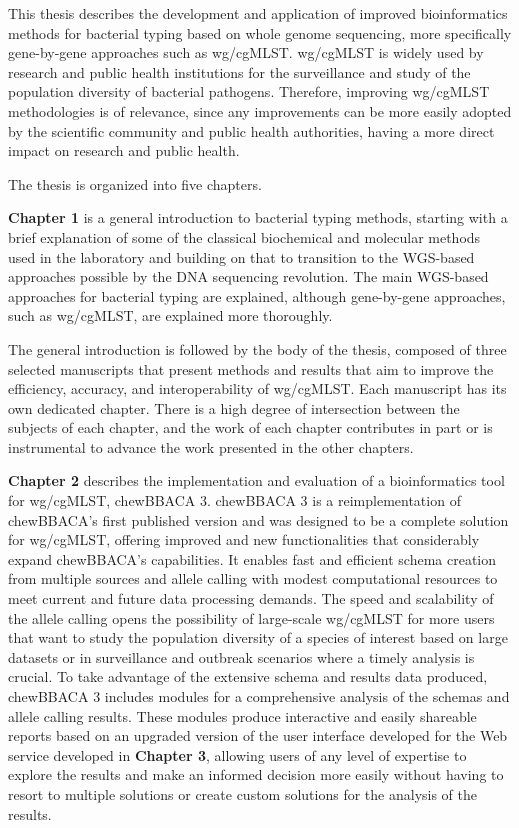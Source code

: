 This thesis describes the development and application of improved bioinformatics methods for bacterial typing based on whole genome sequencing, more specifically gene-by-gene approaches such as \ac{wg/cgMLST}. wg/cgMLST is widely used by research and public health institutions for the surveillance and study of the population diversity of bacterial pathogens. Therefore, improving wg/cgMLST methodologies is of relevance, since any improvements can be more easily adopted by the scientific community and public health authorities, having a more direct impact on research and public health.

The thesis is organized into five chapters.

\textbf{Chapter 1} is a general introduction to bacterial typing methods, starting with a brief explanation of some of the classical biochemical and molecular methods used in the laboratory and building on that to transition to the WGS-based approaches possible by the DNA sequencing revolution. The main WGS-based approaches for bacterial typing are explained, although gene-by-gene approaches, such as wg/cgMLST, are explained more thoroughly.

The general introduction is followed by the body of the thesis, composed of three selected manuscripts that present methods and results that aim to improve the efficiency, accuracy, and interoperability of wg/cgMLST. Each manuscript has its own dedicated chapter. There is a high degree of intersection between the subjects of each chapter, and the work of each chapter contributes in part or is instrumental to advance the work presented in the other chapters.

\textbf{Chapter 2} describes the implementation and evaluation of a bioinformatics tool for wg/cgMLST, chewBBACA 3. chewBBACA 3 is a reimplementation of chewBBACA's first published version and was designed to be a complete solution for wg/cgMLST, offering improved and new functionalities that considerably expand chewBBACA's capabilities. It enables fast and efficient schema creation from multiple sources and allele calling with modest computational resources to meet current and future data processing demands. The speed and scalability of the allele calling opens the possibility of large-scale wg/cgMLST for more users that want to study the population diversity of a species of interest based on large datasets or in surveillance and outbreak scenarios where a timely analysis is crucial. To take advantage of the extensive schema and results data produced, chewBBACA 3 includes modules for a comprehensive analysis of the schemas and allele calling results. These modules produce interactive and easily shareable reports based on an upgraded version of the user interface developed for the Web service developed in \textbf{Chapter 3}, allowing users of any level of expertise to explore the results and make an informed decision more easily without having to resort to multiple solutions or create custom solutions for the analysis of the results.

